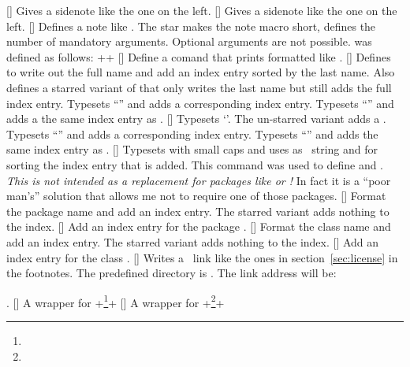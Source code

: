 \documentclass[load-preamble]{cnltx-doc}
\newcommand*\PDF{\cnltxacronym{PDF}{pdf}}
\begin{document}
\begin{commands}
  []
    Gives a sidenote like the one on the left.
  []
    Gives a sidenote like the one on the left.
  [\sarg{}]
    Defines a note like .  The star makes the note macro
    short,  defines the number of mandatory arguments.  Optional
    arguments are not possible.   was defined as follows:
    \verbcode+\newnote*{}+
  []
    Define a comand  that prints  formatted like \cnltx.
  []
    Defines  to write out the full name and add an
    index entry sorted by the last name.  Also defines a starred variant of
     that only writes the last name but still adds the full index
    entry.
    Typesets ``\lppl'' and adds a corresponding index entry.
    Typesets ``\LPPL'' and adds a the same index entry as .
  [\sarg{}]
    Typesets `\license*'.  The un-starred variant adds a
    .
    Typesets ``\ctan'' and adds a corresponding index entry.
    Typesets ``\CTAN'' and adds the same index entry as .
  []
    Typesets  with small caps and uses
     as \PDF\ string and for sorting the index entry
    that is added.  This command was used to define  and .
    \emph{This is not intended as a replacement for packages like 
      or !}  In fact it is a ``poor man's'' solution that
    allows me not to require one of those packages.
  [\sarg{}]
    Format the package name  and add an
    index entry.  The starred variant adds nothing to the index.
  []
    Add an index entry for the package .
  [\sarg{}]
    Format the class name  and add an index
    entry.  The starred variant adds nothing to the index.
  []
    Add an index entry for the class .
  []
    Writes a \ctan\ link like the ones in section~\ref{sec:license} in the
    footnotes.  The predefined directory is .  The
    link address will be:\par
    .
  []
    A wrapper for
    \verbcode+\footnote{}+
  []
    A wrapper for
    \verbcode+\footnote{}+
\end{commands}
\end{document}
